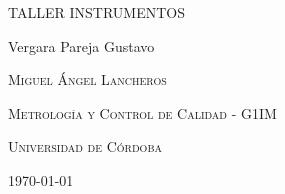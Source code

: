 \documentclass{article}
\author{Gustavo Vergara}
\theoremstyle{mytheoremstyle}
\theoremstyle{mytheoremstyle}
\theoremstyle{myproblemstyle}
\begin{document}
\pgfplotsset{compat=1.18}

\begin{titlepage}
	\centering
	\vspace{2.5cm}
	{\scshape \Large TALLER INSTRUMENTOS \par}
	\vspace{5cm}
	\textbf\large\scshape{\par}
	\vspace{0.5cm}

	{\Large Vergara Pareja Gustavo\par}
	\vspace{5cm}
	{\scshape\Large Miguel Ángel Lancheros\par}
	\vspace{0.3cm}
	{\scshape\Large Metrología y Control de Calidad - G1IM \par}
	\vspace{0.3cm}
	{\scshape\Large Universidad de Córdoba\par}
	\vspace{0.3cm}
	{\Large \today \par}
\end{titlepage}
\newpage
\end{document}
